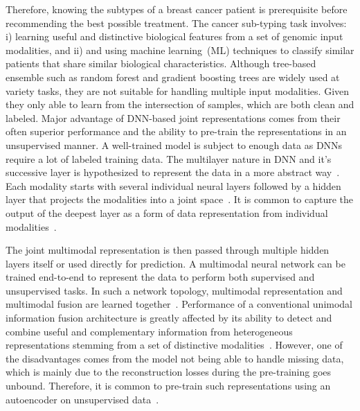 \hspace*{3.5mm} Therefore, knowing the subtypes of a breast cancer patient is prerequisite before recommending the best possible treatment. The cancer sub-typing task involves: i) learning useful and distinctive biological features from a set of genomic input modalities, and ii) and using machine learning~(ML) techniques to classify similar patients that share similar biological characteristics. Although tree-based ensemble such as random forest and gradient boosting trees are widely used at variety tasks, they are not suitable for handling multiple input modalities. Given they only able to learn from the intersection of samples, which are both clean and labeled. Major advantage of DNN-based joint representations comes from their often superior performance and the ability to pre-train the representations in an unsupervised manner. A well-trained model is subject to enough data as DNNs require a lot of labeled training data. The multilayer nature in DNN and it's successive layer is hypothesized to represent the data in a more abstract way~\cite{mmsurvey}. Each modality starts with several individual neural layers followed by a hidden layer that projects the modalities into a joint space~\cite{serban2016multi}. It is common to capture the output of the deepest layer as a form of data representation from individual modalities~\cite{mmsurvey,serban2016multi}. 

\hspace*{3.5mm} The joint multimodal representation is then passed through multiple hidden layers itself or used directly for prediction. A multimodal neural network can be trained end-to-end to represent the data to perform both supervised and unsupervised tasks. In such a network topology, multimodal representation and multimodal fusion are learned together~\cite{wang2018associativemulti}.
Performance of a conventional unimodal information fusion architecture is greatly affected by its ability to detect and combine useful and complementary information from heterogeneous representations stemming from a set of distinctive modalities~\cite{ito2018effects}. 
However, one of the disadvantages comes from the model not being able to handle missing data, which is mainly due to the reconstruction losses during the pre-training goes unbound. Therefore, it is common to pre-train such representations using an autoencoder on unsupervised data~\cite{mmsurvey}. 

